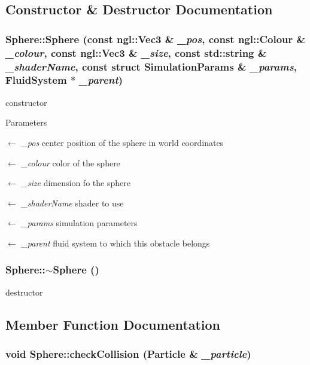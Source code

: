 \subsection{Constructor \& Destructor Documentation}
\hypertarget{classSphere_a6452552678bc35d4621e3ec9272d34a0}{
\subsubsection[{Sphere}]{\setlength{\rightskip}{0pt plus 5cm}Sphere::Sphere (const ngl::Vec3 \& {\em \_\-pos}, \/  const ngl::Colour \& {\em \_\-colour}, \/  const ngl::Vec3 \& {\em \_\-size}, \/  const std::string \& {\em \_\-shaderName}, \/  const struct {\bf SimulationParams} \& {\em \_\-params}, \/  {\bf FluidSystem} $\ast$ {\em \_\-parent})}}
\label{classSphere_a6452552678bc35d4621e3ec9272d34a0}


constructor 
\begin{DoxyParams}{Parameters}
\item[\mbox{$\leftarrow$} {\em \_\-pos}]center position of the sphere in world coordinates \item[\mbox{$\leftarrow$} {\em \_\-colour}]color of the sphere \item[\mbox{$\leftarrow$} {\em \_\-size}]dimension fo the sphere \item[\mbox{$\leftarrow$} {\em \_\-shaderName}]shader to use \item[\mbox{$\leftarrow$} {\em \_\-params}]simulation parameters \item[\mbox{$\leftarrow$} {\em \_\-parent}]fluid system to which this obstacle belongs \end{DoxyParams}
\hypertarget{classSphere_a569c071e50a3e11f678630ee1a17737e}{
\subsubsection[{$\sim$Sphere}]{\setlength{\rightskip}{0pt plus 5cm}Sphere::$\sim$Sphere ()}}
\label{classSphere_a569c071e50a3e11f678630ee1a17737e}


destructor 

\subsection{Member Function Documentation}
\hypertarget{classSphere_a0a18ee7f656154b8c1f60d99bb418c98}{
\subsubsection[{checkCollision}]{\setlength{\rightskip}{0pt plus 5cm}void Sphere::checkCollision ({\bf Particle} \& {\em \_\-particle})}}
\label{classSphere_a0a18ee7f656154b8c1f60d99bb418c98}


